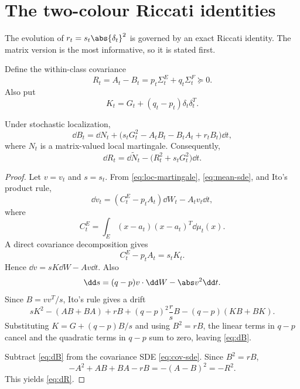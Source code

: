 \documentclass[../../main.tex]{subfiles}
\begin{document}
\section{The two-colour Riccati identities}
\label{sec:riccati}

The evolution of $r_t=s_t\abs{\delta_t}^2$ is governed by an exact Riccati identity. The matrix
version is the most informative, so it is stated first.

Define the within-class covariance
\begin{equation}\label{eq:R-def}
  R_t=A_t-B_t=p_t\Sigma_t^E+q_t\Sigma_t^F\succeq0.
\end{equation}
Also put
\begin{equation}\label{eq:K-def}
  K_t=G_t+(q_t-p_t)\delta_t\delta_t^T.
\end{equation}

\begin{lemma}
\label{lem:matrix-riccati}
Under stochastic localization,
\begin{equation}\label{eq:dB}
  \dd B_t=\dd N_t+\bigl(s_tG_t^2-A_tB_t-B_tA_t+r_tB_t\bigr)\dd t,
\end{equation}
where $N_t$ is a matrix-valued local martingale. Consequently,
\begin{equation}\label{eq:dR}
  \dd R_t=\dd\widetilde N_t-\bigl(R_t^2+s_tG_t^2\bigr)\dd t .
\end{equation}
\end{lemma}

\begin{proof}
Let $v=v_t$ and $s=s_t$. From \eqref{eq:loc-martingale}, \eqref{eq:mean-sde}, and Ito's product
rule,
\begin{equation}\label{eq:dv}
  \dd v_t=(C_t^E-p_tA_t)\dd W_t-A_tv_t\dd t,
\end{equation}
where
\[
  C_t^E=\int_E(x-a_t)(x-a_t)^T\dd\mu_t(x).
\]
A direct covariance decomposition gives
\begin{equation}\label{eq:CE-minus-pA}
  C_t^E-p_tA_t=s_tK_t.
\end{equation}
Hence $\dd v=sK\dd W-Av\dd t$. Also
\[
  \dd s=(q-p)v\cdot\dd W-\abs v^2\dd t.
\]
Since $B=vv^T/s$, Ito's rule gives a drift
\[
  sK^2-(AB+BA)+rB+(q-p)^2\frac rsB-(q-p)(KB+BK).
\]
Substituting $K=G+(q-p)B/s$ and using $B^2=rB$, the linear terms in $q-p$ cancel and the quadratic
terms in $q-p$ sum to zero, leaving \eqref{eq:dB}.

Subtract \eqref{eq:dB} from the covariance SDE \eqref{eq:cov-sde}. Since $B^2=rB$,
\[
  -A^2+AB+BA-rB=-(A-B)^2=-R^2.
\]
This yields \eqref{eq:dR}.
\end{proof}
\end{document}
